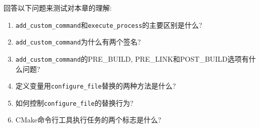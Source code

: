 回答以下问题来测试对本章的理解:

\begin{enumerate}
\item 
\texttt{add\_custom\_command}和\texttt{execute\_process}的主要区别是什么?

\item 
\texttt{add\_custom\_command}为什么有两个签名?

\item 
\texttt{add\_custom\_command}的PRE\_BUILD, PRE\_LINK和POST\_BUILD选项有什么问题?

\item 
定义变量用\texttt{configure\_file}替换的两种方法是什么?

\item 
如何控制\texttt{configure\_file}的替换行为?

\item 
CMake命令行工具执行任务的两个标志是什么?
\end{enumerate}